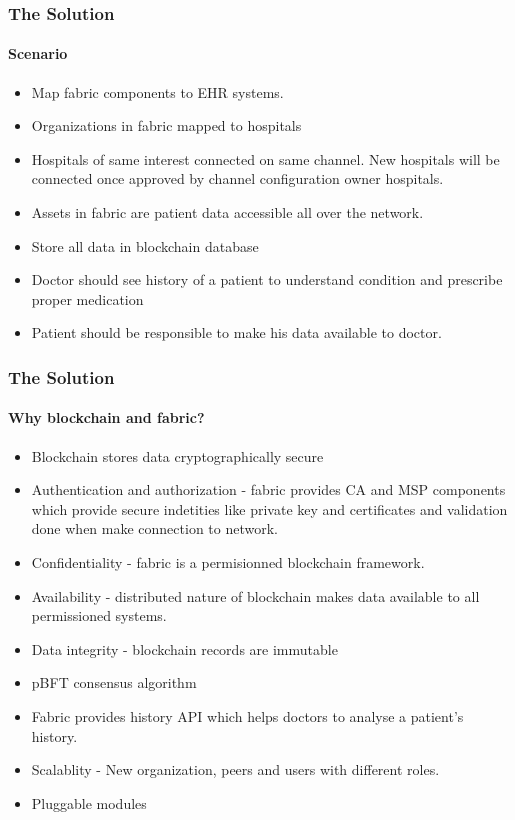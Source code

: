 \documentclass[english,hangout]{beamer}
\begin{document}
\begin{frame}[fragile]
 \frametitle{The Solution}
 \framesubtitle{Scenario}
 \begin{itemize}
     \item Map fabric components to EHR systems.
     \item Organizations in fabric mapped to hospitals
     \item Hospitals of same interest connected on same channel. New hospitals will be connected once approved by channel configuration owner hospitals.
     \item Assets in fabric are patient data accessible all over the network.
     \item Store all data in blockchain database
     \item Doctor should see history of a patient to understand condition and prescribe proper medication
     \item Patient should be responsible to make his data available to doctor. 
 \end{itemize}
\end{frame}



\begin{frame}[fragile]
 \frametitle{The Solution}
 \framesubtitle{Why blockchain and fabric?}
    \begin{itemize}
        \item Blockchain stores data cryptographically secure
        \item Authentication and authorization - fabric provides CA and MSP components which provide secure indetities like private key and certificates and validation done when make connection to network.
        \item Confidentiality - fabric is a permisionned blockchain framework.
        \item Availability - distributed nature of blockchain makes data available to all permissioned systems. 
        \item Data integrity - blockchain records are immutable
        \item pBFT consensus algorithm 
        \item Fabric provides history API which helps doctors to analyse a patient's history.
        \item Scalablity - New organization, peers and users with different roles. 
        \item Pluggable modules
    \end{itemize}
\end{frame}
\end{document}

